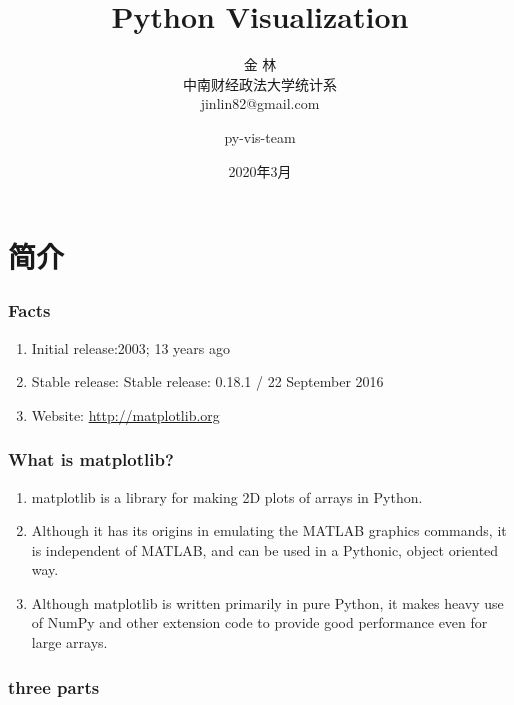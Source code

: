 \documentclass[UTF8,a4paper,12pt]{ctexart}  %
\author{\CJKfamily{kai} 金 \enspace 林 \\ \CJKfamily{kai} 中南财经政法大学统计系 \\ jinlin82@gmail.com}
\title{\LARGE\textbf{Python Visualization}}
\author{py-vis-team}
\date{2020年3月}
\providecommand{\tightlist}{\setlength{\itemsep}{0pt}\setlength{\parskip}{0pt}}
\begin{document}
\maketitle






\hypertarget{ux7b80ux4ecb}{%
\section{简介}\label{ux7b80ux4ecb}}

\hypertarget{facts}{%
\subsubsection{Facts}\label{facts}}

\begin{enumerate}
\def\labelenumi{\arabic{enumi}.}
\tightlist
\item
  Initial release:2003; 13 years ago
\item
  Stable release: Stable release: 0.18.1 / 22 September 2016
\item
  Website: \url{http://matplotlib.org}
\end{enumerate}

\hypertarget{what-is-matplotlib}{%
\subsubsection{What is matplotlib?}\label{what-is-matplotlib}}

\begin{enumerate}
\def\labelenumi{\arabic{enumi}.}
\tightlist
\item
  matplotlib is a library for making 2D plots of arrays in Python.
\item
  Although it has its origins in emulating the MATLAB graphics
  commands, it is independent of MATLAB, and can be used in a
  Pythonic, object oriented way.
\item
  Although matplotlib is written primarily in pure Python, it makes
  heavy use of NumPy and other extension code to provide good
  performance even for large arrays.
\end{enumerate}

\hypertarget{three-parts}{%
\subsubsection{three parts}\label{three-parts}}
\end{document}
